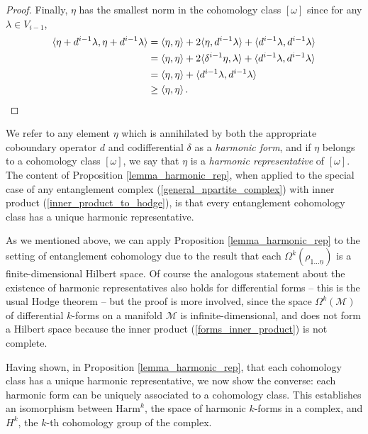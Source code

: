 \documentclass[12pt]{article}
\newcommand{\ul}[1]{{\underline{#1}}}
\numberwithin{equation}{section}
\newcommand{\rhooneton}{{\rho_{\ul{1} \ldots \ul{n}}}}
\begin{document}
\begin{proof}
    Finally, $\eta$ has the smallest norm in the cohomology class $[\omega]$ since for any $\lambda \in V_{i-1}$,
    \begin{align}
        \langle \eta + d^{i-1} \lambda , \eta + d^{i-1} \lambda \rangle &= \langle \eta , \eta \rangle + 2 \langle \eta, d^{i-1} \lambda \rangle + \langle d^{i-1} \lambda , d^{i-1} \lambda \rangle \\
        &= \langle \eta , \eta \rangle + 2 \langle \delta^{i-1} \eta, \lambda \rangle + \langle d^{i-1} \lambda , d^{i-1} \lambda \rangle \nonumber \\
        &= \langle \eta , \eta \rangle + \langle d^{i-1} \lambda , d^{i-1} \lambda \rangle \nonumber \\
        &\geq \langle \eta , \eta \rangle  \, . \qedhere
    \end{align}
\end{proof}
%
We refer to any element $\eta$ which is annihilated by both the appropriate coboundary operator $d$ and codifferential $\delta$ as a \emph{harmonic form}, and if $\eta$ belongs to a cohomology class $[\omega]$, we say that $\eta$ is a \emph{harmonic representative} of $[ \omega ]$. The content of Proposition \ref{lemma_harmonic_rep}, when applied to the special case of any entanglement complex (\ref{general_npartite_complex}) with inner product (\ref{inner_product_to_hodge}), is that every entanglement cohomology class has a unique harmonic representative.

As we mentioned above, we can apply Proposition \ref{lemma_harmonic_rep} to the setting of entanglement cohomology due to the result that each $\Omega^k ( \rhooneton )$ is a finite-dimensional Hilbert space. Of course the analogous statement about the existence of harmonic representatives also holds for differential forms -- this is the usual Hodge theorem -- but the proof is more involved, since the space $\Omega^k ( \mathcal{M} )$ of differential $k$-forms on a manifold $\mathcal{M}$ is infinite-dimensional, and does not form a Hilbert space because the inner product (\ref{forms_inner_product}) is not complete.

Having shown, in Proposition \ref{lemma_harmonic_rep}, that each cohomology class has a unique harmonic representative, we now show the converse: each harmonic form can be uniquely associated to a cohomology class. This establishes an isomorphism between $\mathrm{Harm}^k$, the space of harmonic $k$-forms in a complex, and $H^k$, the $k$-th cohomology group of the complex.
\end{document}
